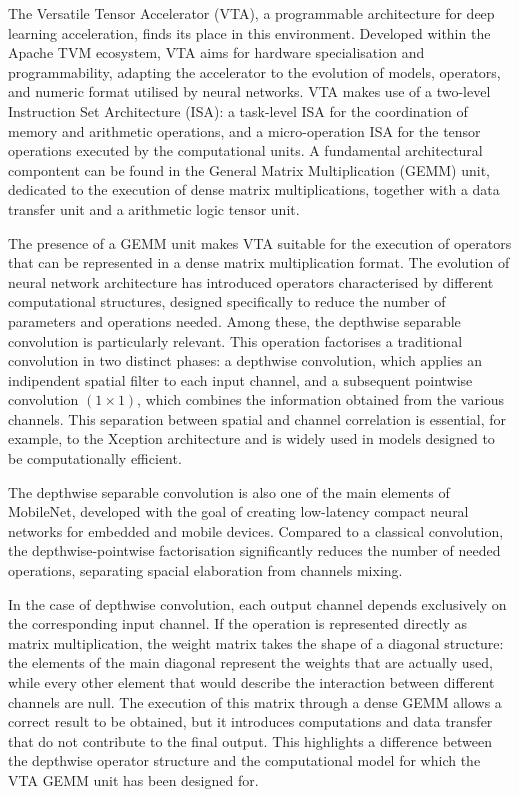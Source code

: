 \documentclass[oneside, binding=0.6cm]{sapthesis}
\begin{document}
	The Versatile Tensor Accelerator (\gls{VTA}), a programmable architecture for deep learning acceleration, finds its place in this environment. Developed within the Apache TVM ecosystem, \gls{VTA} aims for hardware specialisation and programmability, adapting the accelerator to the evolution of models, operators, and numeric format utilised by neural networks. \gls{VTA} makes use of a two-level Instruction Set Architecture (\gls{ISA}): a task-level \gls{ISA} for the coordination of memory and arithmetic operations, and a micro-operation \gls{ISA} for the tensor operations executed by the computational units.\cite{moreau2019hardwaresoftwareblueprintflexibledeep} A fundamental architectural compontent can be found in the General Matrix Multiplication (\gls{GEMM}) unit, dedicated to the execution of dense matrix multiplications, together with a data transfer unit and a arithmetic logic tensor unit. 
	
	The presence of a \gls{GEMM} unit makes \gls{VTA} suitable for the execution of operators that can be represented in a dense matrix multiplication format. The evolution of neural network architecture has introduced operators characterised by different computational structures, designed specifically to reduce the number of parameters and operations needed. Among these, the depthwise separable convolution is particularly relevant. This operation factorises a traditional convolution in two distinct phases: a depthwise convolution, which applies an indipendent spatial filter to each input channel, and a subsequent pointwise convolution $\left(1\times 1\right)$, which combines the information obtained from the various channels.\cite{Chollet_2017_CVPR} This separation between spatial and channel correlation is essential, for example, to the Xception architecture and is widely used in models designed to be computationally efficient.
	
	The depthwise separable convolution is also one of the main elements of MobileNet, developed with the goal of creating low-latency compact neural networks for embedded and mobile devices. \cite{howard2017mobilenetsefficientconvolutionalneural} Compared to a classical convolution, the depthwise-pointwise factorisation significantly reduces the number of needed operations, separating spacial elaboration from channels mixing.
	
	In the case of depthwise convolution, each output channel depends exclusively on the corresponding input channel. If the operation is represented directly as matrix multiplication, the weight matrix takes the shape of a diagonal structure: the elements of the main diagonal represent the weights that are actually used, while every other element that would describe the interaction between different channels are null. The execution of this matrix through a dense \gls{GEMM} allows a correct result to be obtained, but it introduces computations and data transfer that do not contribute to the final output. This highlights a difference between the depthwise operator structure and the computational model for which the \gls{VTA} \gls{GEMM} unit has been designed for.	
	
\end{document}
